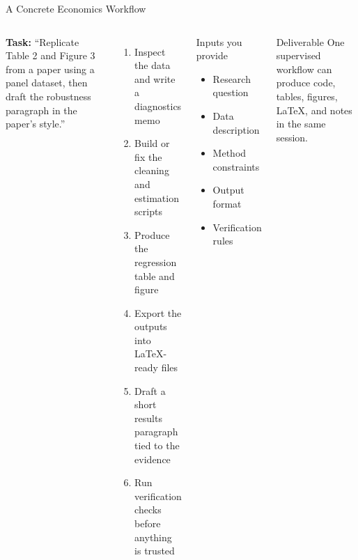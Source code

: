 \documentclass[aspectratio=169,10pt]{beamer}
\begin{document}
\begin{frame}{A Concrete Economics Workflow}
\small
\begin{columns}[T]
\textbf{Task:} ``Replicate Table 2 and Figure 3 from a paper using a panel dataset,
then draft the robustness paragraph in the paper's style.''

\vspace{0.5em}
\begin{enumerate}\itemsep2pt
    \item Inspect the data and write a diagnostics memo
    \item Build or fix the cleaning and estimation scripts
    \item Produce the regression table and figure
    \item Export the outputs into LaTeX-ready files
    \item Draft a short results paragraph tied to the evidence
    \item Run verification checks before anything is trusted
\end{enumerate}

\begin{block}{Inputs you provide}
\begin{itemize}\itemsep2pt
    \item Research question
    \item Data description
    \item Method constraints
    \item Output format
    \item Verification rules
\end{itemize}
\end{block}

\begin{alertblock}{Deliverable}
One supervised workflow can produce code, tables, figures, LaTeX, and notes in the same session.
\end{alertblock}
\end{columns}
\end{frame}
\end{document}
